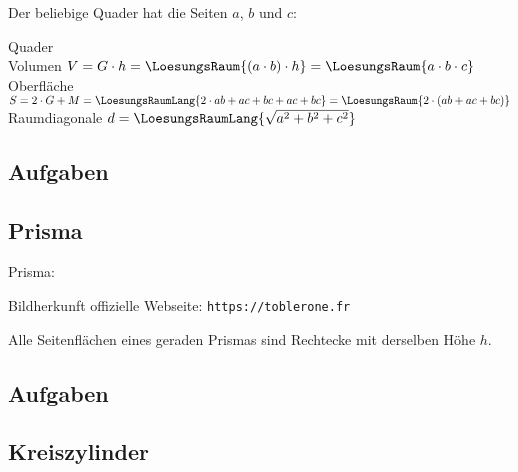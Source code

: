 Der beliebige Quader hat die Seiten $a$, $b$ und $c$:
\begin{gesetz}{Quader}{}\\
  Volumen $V = G\cdot{} h = \LoesungsRaum{(a\cdot{}b)\cdot{}h} = \LoesungsRaum{a\cdot{}b\cdot{}c}$\\
  Oberfläche $S=2\cdot{}G + M = \LoesungsRaumLang{2\cdot{}ab + ac + bc + ac + bc} = \LoesungsRaum{2\cdot{}(ab + ac + bc)}$\\
  Raumdiagonale $d = \LoesungsRaumLang{\sqrt{a^2 + b^2 + c^2}}$
\end{gesetz}

\TNTeop{}
\newpage

\subsection*{Aufgaben}

\newpage


\subsection{Prisma}
Prisma: 

\begin{center}Bildherkunft offizielle Webseite: \texttt{https://toblerone.fr}\end{center}


\begin{bemerkung}{}{}
  Alle Seitenflächen eines geraden Prismas sind Rechtecke mit derselben Höhe $h$.
  \end{bemerkung}

\subsection*{Aufgaben}

\newpage


\subsection{Kreiszylinder}

